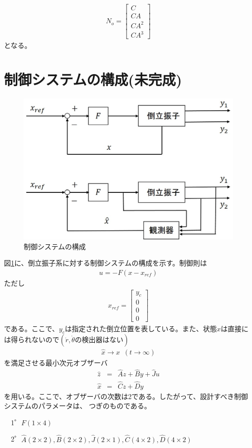\documentclass[a4j,11pt,twoside]{ujbook}
\begin{document}
		\begin{eqnarray*}
			N_o = \left[
			\begin{array}{c}
				C\\
				CA\\
				CA^2\\
				CA^{3}
			\end{array}
			\right]
		\end{eqnarray*}
		となる。
	\section{制御システムの構成(未完成)}
	
		\begin{figure}[htbp]
			\begin{center}
				\includegraphics[width = 0.6 \linewidth]{system.eps}
				\caption{制御システムの構成}
				\label{fig:制御システムの構成}
			\end{center}
		\end{figure}
		図\ref{fig:制御システムの構成}に、倒立振子系に対する制御システムの構成を示す。制御則は
		\begin{eqnarray*}
			u = -F(x-x_{ref})
		\end{eqnarray*}
		ただし
		\begin{eqnarray*}
			x_{ref} = \left[
			\begin{array}{c}
				y_c\\
				0\\
				0\\
				0
			\end{array}
			\right]
		\end{eqnarray*}
		である。ここで、$y_c$は指定された倒立位置を表している。また、状態$x$は直接には得られないので$(\dot{r},\dot{\theta}の検出器はない)$
		\begin{eqnarray*}
			\hat{x} \to x \,\,\, (t \to \infty)
			\label{eq:xhat,x}
		\end{eqnarray*}
		を満足させる最小次元オブザーバ
		\begin{eqnarray}
			\hat{z} & = & \hat{A}z + \hat{B}y + \hat{J}u
			\label{eq:zhat}\\
			\hat{x} & = & \hat{C}z + \hat{D}y
			\label{eq:xhat}
		\end{eqnarray}
		を用いる。ここで、オブザーバの次数は2である。したがって、設計すべき制御システムのパラメータは、
		つぎのものである。
		\begin{description}
			\item 　1゜$F(1\times4)$
			\item 　2゜$\hat{A}(2\times2),\hat{B}(2\times2),\hat{J}(2\times1),
					\hat{C}(4\times2),\hat{D}(4\times2)$
		\end{description}
		
\end{document}
